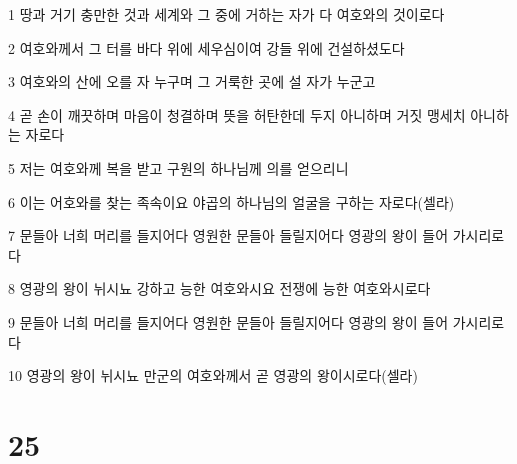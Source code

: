 \par 1 땅과 거기 충만한 것과 세계와 그 중에 거하는 자가 다 여호와의 것이로다
\par 2 여호와께서 그 터를 바다 위에 세우심이여 강들 위에 건설하셨도다
\par 3 여호와의 산에 오를 자 누구며 그 거룩한 곳에 설 자가 누군고
\par 4 곧 손이 깨끗하며 마음이 청결하며 뜻을 허탄한데 두지 아니하며 거짓 맹세치 아니하는 자로다
\par 5 저는 여호와께 복을 받고 구원의 하나님께 의를 얻으리니
\par 6 이는 어호와를 찾는 족속이요 야곱의 하나님의 얼굴을 구하는 자로다(셀라)
\par 7 문들아 너희 머리를 들지어다 영원한 문들아 들릴지어다 영광의 왕이 들어 가시리로다
\par 8 영광의 왕이 뉘시뇨 강하고 능한 여호와시요 전쟁에 능한 여호와시로다
\par 9 문들아 너희 머리를 들지어다 영원한 문들아 들릴지어다 영광의 왕이 들어 가시리로다
\par 10 영광의 왕이 뉘시뇨 만군의 여호와께서 곧 영광의 왕이시로다(셀라)

\chapter{25}

